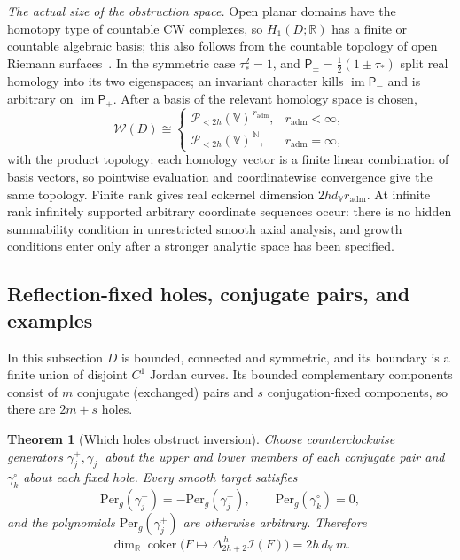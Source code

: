 \documentclass[11pt,a4paper]{article}
\numberwithin{equation}{section}
\newtheorem{theorem}{Theorem}[section]
\theoremstyle{definition}
\theoremstyle{remark}
\theoremstyle{plain}
\newcommand{\RR}{\mathbb R}
\newcommand{\I}{\mathcal I}
\newcommand{\Per}{\mathrm{Per}}
\newcommand{\lapH}{\Delta_{2h+2}^{\,h}}
\newcommand{\VV}{\mathbb V}                       %
\newcommand{\dV}{d_{\VV}}                         %
\newcommand{\PolH}{\mathscr P_{<2h}(\VV)}
\begin{document}
\emph{The actual size of the obstruction space.} Open planar domains have the
homotopy type of countable CW complexes, so $H_1(D;\RR)$ has a finite or
countable algebraic basis; this also follows from the countable topology of
open Riemann surfaces~\cite{Forster}. In the symmetric case $\tau_*^2=1$, and
$\mathsf P_\pm=\tfrac12(1\pm\tau_*)$ split real homology into its two
eigenspaces; an invariant character kills $\operatorname{im}\mathsf P_-$ and is
arbitrary on $\operatorname{im}\mathsf P_+$. After a basis of the relevant
homology space is chosen,
\begin{equation}\label{h:eq:W-product}
 \mathscr W(D)\cong
 \begin{cases}
  \PolH^{\,r_{\mathrm{adm}}}, & r_{\mathrm{adm}}<\infty,\\
  \PolH^{\,\mathbb N}, & r_{\mathrm{adm}}=\infty,
 \end{cases}
\end{equation}
with the product topology: each homology vector is a finite linear combination
of basis vectors, so pointwise evaluation and coordinatewise convergence give
the same topology. Finite rank gives real cokernel dimension
$2h\dV r_{\mathrm{adm}}$. At infinite rank infinitely supported arbitrary
coordinate sequences occur: there is no hidden summability condition in
unrestricted smooth axial analysis, and growth conditions enter only after a
stronger analytic space has been specified.

\subsection{Reflection-fixed holes, conjugate pairs, and examples}
\label{h:sec:holes}

In this subsection $D$ is bounded, connected and symmetric, and its boundary is
a finite union of disjoint $C^1$ Jordan curves. Its bounded complementary
components consist of $m$ conjugate (exchanged) pairs and $s$
conjugation-fixed components, so there are $2m+s$ holes.

\begin{theorem}[Which holes obstruct inversion]\label{h:thm:holes}
Choose counterclockwise generators $\gamma^+_j,\gamma^-_j$ about the upper and
lower members of each conjugate pair and $\gamma^\circ_k$ about each fixed hole.
Every smooth target satisfies
\begin{equation}\label{h:eq:paired-periods}
 \Per_g(\gamma^-_j)=-\Per_g(\gamma^+_j),\qquad \Per_g(\gamma^\circ_k)=0,
\end{equation}
and the polynomials $\Per_g(\gamma^+_j)$ are otherwise arbitrary. Therefore
\begin{equation}\label{h:eq:finite-dimension}
 \dim_\RR\operatorname{coker}\bigl(F\mapsto\lapH\I(F)\bigr)=2h\,\dV\,m .
\end{equation}
\end{theorem}
\end{document}
